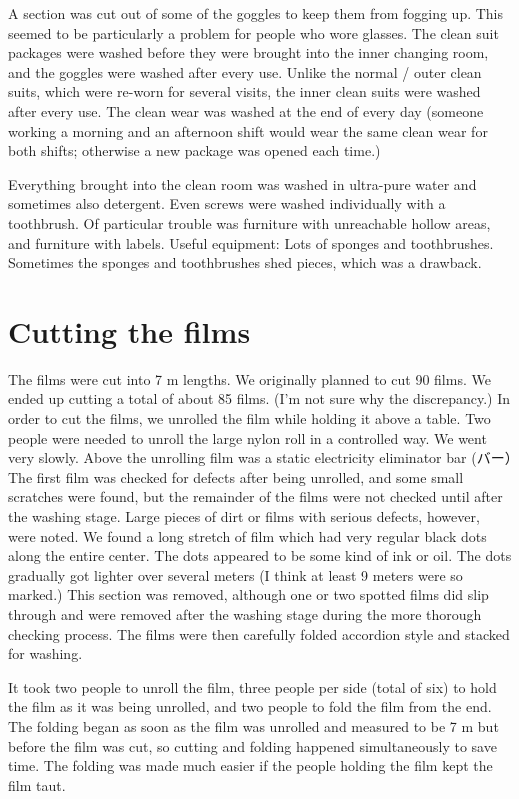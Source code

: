 \documentclass{article}
\begin{document}
A section was cut out of some of the goggles to keep them from fogging up. This seemed to be particularly a problem for people who wore glasses. The clean suit packages were washed before they were brought into the inner changing room, and the goggles were washed after every use. Unlike the normal / outer clean suits, which were re-worn for several visits, the inner clean suits were washed after every use. The clean wear was washed at the end of every day (someone working a morning and an afternoon shift would wear the same clean wear for both shifts; otherwise a new package was opened each time.) 

Everything brought into the clean room was washed in ultra-pure water and sometimes also detergent.  Even screws were washed individually with a toothbrush. 
Of particular trouble was furniture with unreachable hollow areas, and furniture with labels.  Useful equipment: Lots of sponges and toothbrushes. Sometimes the sponges and toothbrushes shed pieces, which was a drawback. 


\section{Cutting the films}
The films were cut into 7 m lengths. We originally planned to cut 90 films. We ended up cutting a total of about 85 films. (I'm not sure why the discrepancy.) 
%
In order to cut the films, we unrolled the film while holding it above a table. Two people were needed to unroll the large nylon roll in a controlled way. We went very slowly. Above the unrolling film was a static electricity eliminator bar (バー）The first film was checked for defects after being unrolled, and some small scratches were found, but the remainder of the films were not checked until after the washing stage.  Large pieces of dirt or films with serious defects, however, were noted.  We found a long stretch of film which had very regular black dots along the entire center. The dots appeared to be some kind of ink or oil. The dots gradually got lighter over several meters (I think at least 9 meters were so marked.) This section was removed, although one or two spotted films did slip through and were removed after the washing stage during the more thorough checking process. 
The films were then carefully folded accordion style and stacked for washing.

It took two people to unroll the film, three people per side (total of six) to hold the film as it was being unrolled, and two people to fold the film from the end. The folding began as soon as the film was unrolled and measured to be 7 m but before the film was cut, so cutting and folding happened simultaneously to save time. The folding was made much easier if the people holding the film kept the film taut. 
\end{document}
